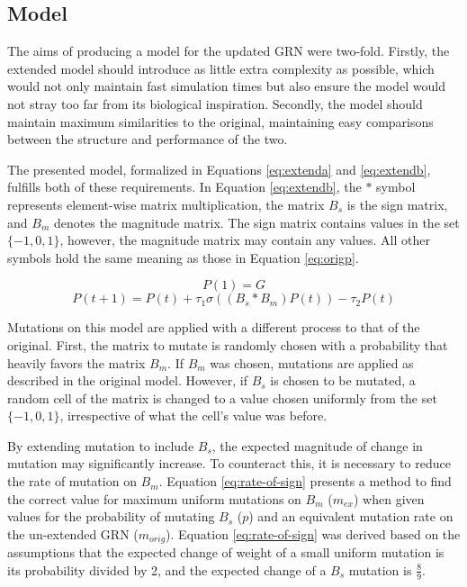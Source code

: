 \documentclass[twocolumn,a4paper,11pt]{article}
\begin{document}
    \subsection{Model}
    The aims of producing a model for the updated GRN were two-fold. Firstly, the extended model should introduce as little extra complexity as possible, which would not only maintain fast simulation times but also ensure the model would not stray too far from its biological inspiration. Secondly, the model should maintain maximum similarities to the original, maintaining easy comparisons between the structure and performance of the two.

    The presented model, formalized in Equations \ref{eq:extenda} and \ref{eq:extendb}, fulfills both of these requirements. In Equation \ref{eq:extendb}, the $*$ symbol represents element-wise matrix multiplication, the matrix $B_s$ is the sign matrix, and $B_m$ denotes the magnitude matrix. The sign matrix contains values in the set $\{-1,0,1\}$, however, the magnitude matrix may contain any values. All other symbols hold the same meaning as those in Equation \ref{eq:origp}.

    \begin{equation} \label{eq:extenda}
        P(1) = G
    \end{equation}
    \begin{equation} \label{eq:extendb}
        P(t+1) = P(t) + \tau_1 \sigma ((B_s * B_m) P(t)) - \tau_2 P(t)
    \end{equation}

    Mutations on this model are applied with a different process to that of the original. First, the matrix to mutate is randomly chosen with a probability that heavily favors the matrix $B_m$. If $B_m$ was chosen, mutations are applied as described in the original model. However, if $B_s$ is chosen to be mutated, a random cell of the matrix is changed to a value chosen uniformly from the set $\{-1,0,1\}$, irrespective of what the cell's value was before.

    By extending mutation to include $B_s$, the expected magnitude of change in mutation may significantly increase. To counteract this, it is necessary to reduce the rate of mutation on $B_m$. Equation \ref{eq:rate-of-sign} presents a method to find the correct value for maximum uniform mutations on $B_m$ ($m_{ex}$) when given values for the probability of mutating $B_s$ ($p$) and an equivalent mutation rate on the un-extended GRN ($m_{orig}$). Equation \ref{eq:rate-of-sign} was derived based on the assumptions that the expected change of weight of a small uniform mutation is its probability divided by 2, and the expected change of a $B_s$ mutation is $\frac{8}{9}$.
\end{document}
